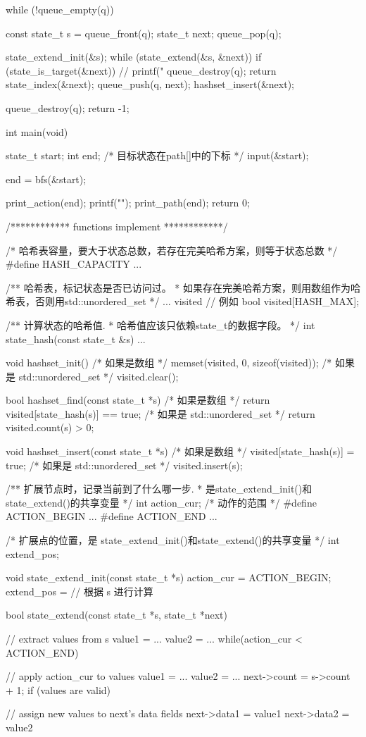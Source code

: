 \begin{Codex}[label=bfs_template.c]
{    while (!queue_empty(q)) {
        const state_t s = queue_front(q);
        state_t next;
        queue_pop(q);

        state_extend_init(&s);
        while (state_extend(&s, &next)) {
            if (state_is_target(&next)) {
                // printf("%
                queue_destroy(q);
                return state_index(&next);
            }
            queue_push(q, next);
            hashset_insert(&next);
        }
    }
    queue_destroy(q);
    return -1;
}

int main(void) {
    state_t start;
    int end; /* 目标状态在path[]中的下标 */
    input(&start);

    end = bfs(&start);

    print_action(end);
    printf("\n");
    print_path(end);
    return 0;
}

/************ functions implement ************/

/* 哈希表容量，要大于状态总数，若存在完美哈希方案，则等于状态总数 */
#define HASH_CAPACITY ...

/** 哈希表，标记状态是否已访问过。
 * 如果存在完美哈希方案，则用数组作为哈希表，否则用std::unordered_set
 */
... visited
// 例如 bool visited[HASH_MAX];

/** 计算状态的哈希值.
 * 哈希值应该只依赖state_t的数据字段。
 */
int state_hash(const state_t &s) {
    ...
}

void hashset_init() {
    /* 如果是数组 */
    memset(visited, 0, sizeof(visited));
    /* 如果是 std::unordered_set */
    visited.clear();
}

bool hashset_find(const state_t *s) {
    /* 如果是数组 */
    return visited[state_hash(s)] == true;
    /* 如果是 std::unordered_set */
    return visited.count(s) > 0;
}

void hashset_insert(const state_t *s) {
    /* 如果是数组 */
    visited[state_hash(s)] = true;
    /* 如果是 std::unordered_set */
    visited.insert(s);
}

/** 扩展节点时，记录当前到了什么哪一步.
 * 是state_extend_init()和state_extend()的共享变量
 */
int action_cur;
/* 动作的范围 */
#define ACTION_BEGIN ...
#define ACTION_END ...

/* 扩展点的位置，是 state_extend_init()和state_extend()的共享变量 */
int extend_pos;

void state_extend_init(const state_t *s) {
    action_cur = ACTION_BEGIN;
    extend_pos = // 根据 s 进行计算
}

bool state_extend(const state_t *s, state_t *next) {
    // extract values from s
    value1 = ...
    value2 = ...
    while(action_cur < ACTION_END) {
        // apply action_cur to values
        value1 = ...
        value2 = ...
        next->count = s->count + 1;
        if (values are valid) {
            // assign new values to next's data fields
            next->data1 = value1
            next->data2 = value2

}}}
\end{Codex}
